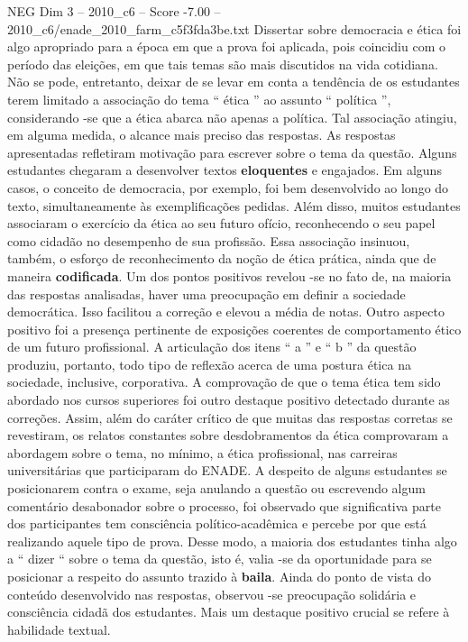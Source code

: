 \begin{textsample}{NEG Dim 3 – 2010\_c6 – Score -7.00 – 2010\_c6/enade\_2010\_farm\_c5f3fda3be.txt}
Dissertar sobre democracia e ética foi algo apropriado para a época em que a prova foi aplicada, pois coincidiu com o período das eleições, em que tais temas são mais discutidos na vida cotidiana.
Não se pode, entretanto, deixar de se levar em conta a tendência de os estudantes terem limitado a associação do tema “ ética ” ao assunto “ política ”, considerando -se que a ética abarca não apenas a política.
Tal associação atingiu, em alguma medida, o alcance mais preciso das respostas.
As respostas apresentadas refletiram motivação para escrever sobre o tema da questão.
Alguns estudantes chegaram a desenvolver textos \textbf{eloquentes} e engajados.
Em alguns casos, o conceito de democracia, por exemplo, foi bem desenvolvido ao longo do texto, simultaneamente às exemplificações pedidas.
Além disso, muitos estudantes associaram o exercício da ética ao seu futuro ofício, reconhecendo o seu papel como cidadão no desempenho de sua profissão.
Essa associação insinuou, também, o esforço de reconhecimento da noção de ética prática, ainda que de maneira \textbf{codificada}.
Um dos pontos positivos revelou -se no fato de, na maioria das respostas analisadas, haver uma preocupação em definir a sociedade democrática.
Isso facilitou a correção e elevou a média de notas.
Outro aspecto positivo foi a presença pertinente de exposições coerentes de comportamento ético de um futuro profissional.
A articulação dos itens “ a ” e “ b ” da questão produziu, portanto, todo tipo de reflexão acerca de uma postura ética na sociedade, inclusive, corporativa.
A comprovação de que o tema ética tem sido abordado nos cursos superiores foi outro destaque positivo detectado durante as correções.
Assim, além do caráter crítico de que muitas das respostas corretas se revestiram, os relatos constantes sobre desdobramentos da ética comprovaram a abordagem sobre o tema, no mínimo, a ética profissional, nas carreiras universitárias que participaram do ENADE.
A despeito de alguns estudantes se posicionarem contra o exame, seja anulando a questão ou escrevendo algum comentário desabonador sobre o processo, foi observado que significativa parte dos participantes tem consciência político-acadêmica e percebe por que está realizando aquele tipo de prova.
Desse modo, a maioria dos estudantes tinha algo a “ dizer “ sobre o tema da questão, isto é, valia -se da oportunidade para se posicionar a respeito do assunto trazido à \textbf{baila}.
Ainda do ponto de vista do conteúdo desenvolvido nas respostas, observou -se preocupação solidária e consciência cidadã dos estudantes.
Mais um destaque positivo crucial se refere à habilidade textual.

\end{textsample}
